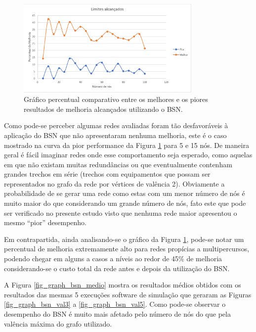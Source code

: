 \begin{figure} [ht]%
	\centering
	\includegraphics[width=0.8\textwidth]{./figuras/BSN-pior-melhor-exec.png} %
	\caption[Limites de melhoria alcançados]{Gráfico percentual comparativo entre os melhores e os piores resultados de melhoria alcançados utilizando o BSN.}
	\label{fig_graph_bsn_pior_melhor}
\end{figure}

Como pode-se perceber algumas redes avaliadas foram tão desfavoráveis à aplicação do BSN que não apresentaram nenhuma melhoria, este é o caso mostrado na curva da pior performance da Figura \ref{fig_graph_bsn_pior_melhor} para 5 e 15 nós. De maneira geral é fácil imaginar redes onde esse comportamento seja esperado, como aquelas em que não existam muitas redundâncias ou que eventualmente contenham grandes trechos em série (trechos com equipamentos que possam ser representados no grafo da rede por vértices de valência 2). Obviamente a probabilidade de se gerar uma rede como estas com um menor número de nós é muito maior do que considerando um grande número de nós, fato este que pode ser verificado no presente estudo visto que nenhuma rede maior apresentou o mesmo ``pior'' desempenho.

Em contrapartida, ainda analisando-se o gráfico da Figura \ref{fig_graph_bsn_pior_melhor}, pode-se notar um percentual de melhoria extremamente alto para redes propícias a multipercursos, podendo chegar em alguns a casos a níveis ao redor de 45\% de melhoria considerando-se o custo total da rede antes e depois da utilização do BSN. %

A Figura \ref{fig_graph_bsn_medio} mostra os resultados médios obtidos com os resultados das mesmas 5 execuções software de simulação que geraram as Figuras \ref{fig_graph_bsn_val3} a \ref{fig_graph_bsn_val5}. Como pode-se observar o desempenho do BSN é muito mais afetado pelo número de nós do que pela valência máxima do grafo utilizado.


